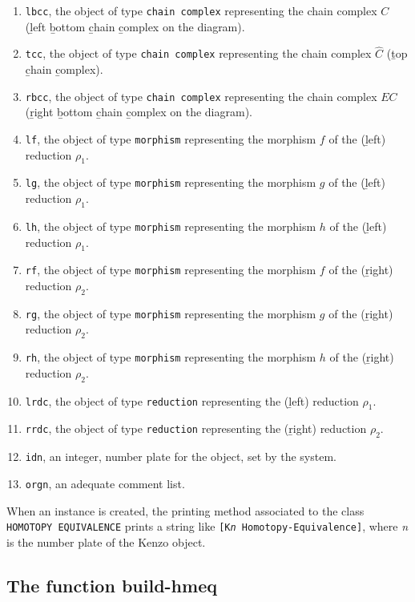 \begin{enumerate}
\item {\tt lbcc}, the object of type {\tt chain complex}  representing the chain complex $C$ 
(\b left \b bottom \b chain \b complex on the diagram).
\item {\tt tcc},  the object of type {\tt chain complex}  representing the chain complex $\hat C$ 
(\b top \b chain \b complex).
\item {\tt rbcc}, the object of type {\tt chain complex}  representing the chain complex $EC$ 
(\b right \b bottom \b chain \b complex on the diagram).
\item {\tt lf}, the object of type {\tt morphism}  representing the morphism $f$ of the (\b left) reduction $\rho_1$.
\item {\tt lg}, the object of type {\tt morphism}  representing the morphism $g$ of the (\b left) reduction $\rho_1$.
\item {\tt lh}, the object of type {\tt morphism}  representing the morphism $h$ of the (\b left) reduction $\rho_1$.
\item {\tt rf}, the object of type {\tt morphism}  representing the morphism $f$ of the (\b right) reduction $\rho_2$.
\item {\tt rg}, the object of type {\tt morphism}  representing the morphism $g$ of the (\b right) reduction $\rho_2$.
\item {\tt rh}, the object of type {\tt morphism}  representing the morphism $h$ of the (\b right) reduction $\rho_2$.
\item {\tt lrdc},  the object of type {\tt reduction}  representing the  (\b left) reduction $\rho_1$.
\item {\tt rrdc},  the object of type {\tt reduction}  representing the (\b right) reduction $\rho_2$.
\item {\tt idn}, an integer, number plate for the object, set by the system.
\item {\tt orgn}, an adequate comment list.
\end{enumerate}
When an instance is created, the  printing method associated to the class {\tt HOMOTOPY EQUIVALENCE}
prints a string like {\tt [K{\em n} Homotopy-Equivalence]}, where {\em n} is the number plate of the Kenzo object.

\subsection {The function build-hmeq}

